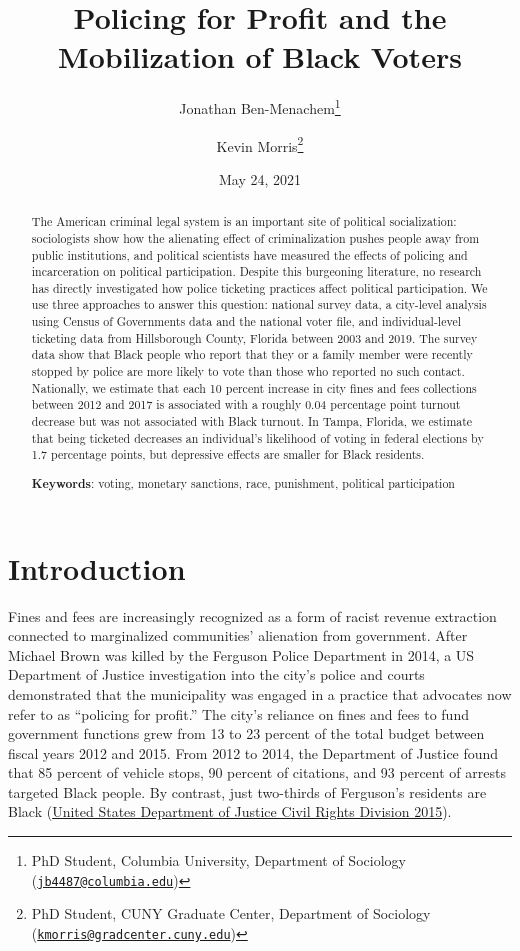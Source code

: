 \documentclass[
  12pt,
]{article}
\title{Policing for Profit and the Mobilization of Black Voters}
\author{Jonathan Ben-Menachem\footnote{PhD Student, Columbia University, Department of Sociology (\href{mailto:jb4487@columbia.edu}{\nolinkurl{jb4487@columbia.edu}})} \and Kevin Morris\footnote{PhD Student, CUNY Graduate Center, Department of Sociology (\href{mailto:kmorris@gradcenter.cuny.edu}{\nolinkurl{kmorris@gradcenter.cuny.edu}})}}
\date{May 24, 2021}
\begin{document}
\maketitle
\begin{abstract}
The American criminal legal system is an important site of political socialization: sociologists show how the alienating effect of criminalization pushes people away from public institutions, and political scientists have measured the effects of policing and incarceration on political participation. Despite this burgeoning literature, no research has directly investigated how police ticketing practices affect political participation. We use three approaches to answer this question: national survey data, a city-level analysis using Census of Governments data and the national voter file, and individual-level ticketing data from Hillsborough County, Florida between 2003 and 2019. The survey data show that Black people who report that they or a family member were recently stopped by police are more likely to vote than those who reported no such contact. Nationally, we estimate that each 10 percent increase in city fines and fees collections between 2012 and 2017 is associated with a roughly 0.04 percentage point turnout decrease but was not associated with Black turnout. In Tampa, Florida, we estimate that being ticketed decreases an individual's likelihood of voting in federal elections by 1.7 percentage points, but depressive effects are smaller for Black residents.

\hfill\break

\textbf{Keywords}: voting, monetary sanctions, race, punishment, political participation
\end{abstract}

\pagebreak

\doublespacing

\hypertarget{introduction}{%
\section*{Introduction}\label{introduction}}

Fines and fees are increasingly recognized as a form of racist revenue extraction connected to marginalized communities' alienation from government. After Michael Brown was killed by the Ferguson Police Department in 2014, a US Department of Justice investigation into the city's police and courts demonstrated that the municipality was engaged in a practice that advocates now refer to as ``policing for profit.'' The city's reliance on fines and fees to fund government functions grew from 13 to 23 percent of the total budget between fiscal years 2012 and 2015. From 2012 to 2014, the Department of Justice found that 85 percent of vehicle stops, 90 percent of citations, and 93 percent of arrests targeted Black people. By contrast, just two-thirds of Ferguson's residents are Black (\protect\hyperlink{ref-UnitedStatesDepartmentofJusticeCivilRightsDivision2015}{United States Department of Justice Civil Rights Division 2015}).
\end{document}
